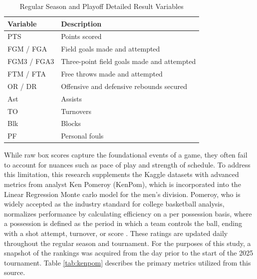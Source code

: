 \documentclass[12pt,leqno]{article}\usepackage[pdftex]{graphicx}\usepackage[dvipsnames]{xcolor}
\theoremstyle{remark}
\begin{document}
\begin{table}[h]
\centering
\begin{tabular}{ll}
\hline
\textbf{Variable} & \textbf{Description} \\
\hline
PTS         & Points scored \\
FGM / FGA   & Field goals made and attempted \\
FGM3 / FGA3 & Three-point field goals made and attempted \\
FTM / FTA   & Free throws made and attempted \\
OR / DR     & Offensive and defensive rebounds secured \\
Ast         & Assists \\
TO          & Turnovers \\
Blk         & Blocks \\
PF          & Personal fouls \\
\hline
\end{tabular}
\caption{Regular Season and Playoff Detailed Result Variables}
\label{tab:boxscore}
\end{table}

While raw box scores capture the foundational events of a game, they often fail to account for nuances such as pace of play and strength of schedule. To address this limitation, this research supplements the Kaggle datasets with advanced metrics from analyst Ken Pomeroy (KenPom), which is incorporated into the Linear Regression Monte carlo model for the men's division. Pomeroy, who is widely accepted as the industry standard for college basketball analysis, normalizes performance by calculating efficiency on a per possession basis, where a possession is defined as the period in which a team controls the ball, ending with a shot attempt, turnover, or score \cite{KenPom}. These ratings are updated daily throughout the regular season and tournament. For the purposes of this study, a snapshot of the rankings was acquired from the day prior to the start of the 2025 tournament. Table \ref{tab:kenpom} describes the primary metrics utilized from this source.
\end{document}
